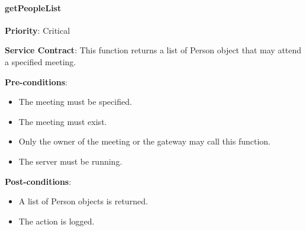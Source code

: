 		    \paragraph{getPeopleList}
			\begin{description}
			    \item{\textbf{Priority}:} Critical%
			    \item{\textbf{Service Contract}:} This function returns a list of Person object that may attend a specified meeting.
			    \item{\textbf{Pre-conditions}:}%
    			    \begin{itemize}
    			        \item The meeting must be specified.
    			        \item The meeting must exist.%
    			        \item Only the owner of the meeting or the gateway may call this function. \item The server must be running.%
    			    \end{itemize}
			    \item{\textbf{Post-conditions}:} %
    			    \begin{itemize}
    			    \item A list of Person objects is returned.%
    			    \item The action is logged.%
    			    \end{itemize}
			\end{description}
			

